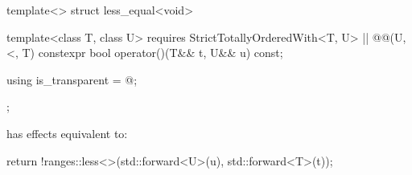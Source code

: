 {%
\begin{itemdecl}
template<> struct less_equal<void> {
  template<class T, class U>
    requires StrictTotallyOrderedWith<T, U> || @\textit{}@(U, <, T)
  constexpr bool operator()(T&& t, U&& u) const;

  using is_transparent = @\unspecnc@;
};
\end{itemdecl}

\begin{itemdescr}
\pnum
{} has effects equivalent to:
\begin{codeblock}
return !ranges::less<>{}(std::forward<U>(u), std::forward<T>(t));
\end{codeblock}
\end{itemdescr}
} %
